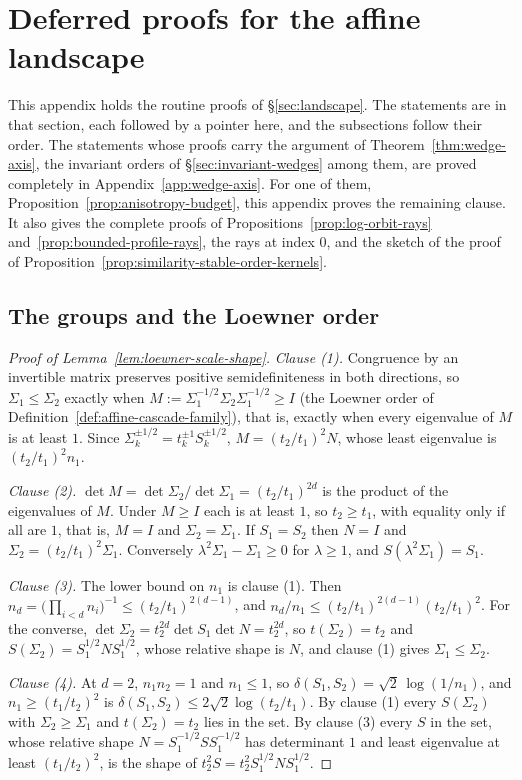 \section{Deferred proofs for the affine landscape}\label{app:proofs}

This appendix holds the routine proofs of \S\ref{sec:landscape}. The statements are in that section,
each followed by a pointer here, and the subsections follow their order. The statements whose proofs
carry the argument of Theorem~\ref{thm:wedge-axis}, the invariant orders of
\S\ref{sec:invariant-wedges} among them, are proved completely in Appendix~\ref{app:wedge-axis}. For
one of them, Proposition~\ref{prop:anisotropy-budget}, this appendix proves the remaining clause. It
also gives the complete proofs of Propositions~\ref{prop:log-orbit-rays}
and~\ref{prop:bounded-profile-rays}, the rays at index $0$, and the sketch of the proof of
Proposition~\ref{prop:similarity-stable-order-kernels}.

\subsection{The groups and the Loewner order}

\begin{proof}[Proof of Lemma~\ref{lem:loewner-scale-shape}]
\emph{Clause (1).} Congruence by an invertible matrix preserves positive semidefiniteness in both
directions, so $\Sigma_1 \le \Sigma_2$ exactly when $M := \Sigma_1^{-1/2}\Sigma_2\Sigma_1^{-1/2}
\ge I$ (the Loewner order of Definition~\ref{def:affine-cascade-family}), that is, exactly when
every eigenvalue of $M$ is at least $1$. Since
$\Sigma_k^{\pm1/2} = t_k^{\pm1}S_k^{\pm1/2}$, $M = (t_2/t_1)^2N$, whose least eigenvalue is
$(t_2/t_1)^2n_1$.

\emph{Clause (2).} $\det M = \det\Sigma_2/\det\Sigma_1 = (t_2/t_1)^{2d}$ is the product of the
eigenvalues of $M$. Under $M \ge I$ each is at least $1$, so $t_2 \ge t_1$, with equality only if all
are $1$, that is, $M = I$ and $\Sigma_2 = \Sigma_1$. If $S_1 = S_2$ then $N = I$ and
$\Sigma_2 = (t_2/t_1)^2\Sigma_1$. Conversely $\lambda^2\Sigma_1 - \Sigma_1 \ge 0$ for $\lambda \ge 1$,
and $S(\lambda^2\Sigma_1) = S_1$.

\emph{Clause (3).} The lower bound on $n_1$ is clause (1). Then
$n_d = \bigl(\prod_{i<d}n_i\bigr)^{-1} \le (t_2/t_1)^{2(d-1)}$, and
$n_d/n_1 \le (t_2/t_1)^{2(d-1)}(t_2/t_1)^2$. For the converse,
$\det\Sigma_2 = t_2^{2d}\det S_1\det N = t_2^{2d}$, so $t(\Sigma_2) = t_2$ and
$S(\Sigma_2) = S_1^{1/2}NS_1^{1/2}$, whose relative shape is $N$, and clause (1) gives
$\Sigma_1 \le \Sigma_2$.

\emph{Clause (4).} At $d = 2$, $n_1n_2 = 1$ and $n_1 \le 1$, so
$\delta(S_1,S_2) = \sqrt2\,\log(1/n_1)$, and $n_1 \ge (t_1/t_2)^2$ is
$\delta(S_1,S_2) \le 2\sqrt2\log(t_2/t_1)$. By clause (1) every $S(\Sigma_2)$ with
$\Sigma_2 \ge \Sigma_1$ and $t(\Sigma_2) = t_2$ lies in the set. By clause (3) every $S$ in the set,
whose relative shape $N = S_1^{-1/2}SS_1^{-1/2}$ has determinant $1$ and least eigenvalue at least
$(t_1/t_2)^2$, is the shape of $t_2^2S = t_2^2S_1^{1/2}NS_1^{1/2}$.
\end{proof}

